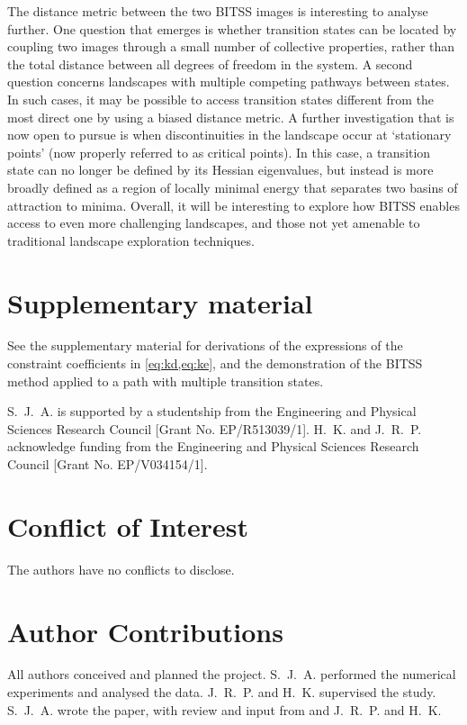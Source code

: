 \documentclass[aip,jcp,reprint,twocolumn]{revtex4-1}
\begin{document}
The distance metric between the two BITSS images is interesting to analyse further.
One question that emerges is whether transition states can be located by coupling two images through a small number of collective properties, rather than the total distance between all degrees of freedom in the system.
A second question concerns landscapes with multiple competing pathways between states.
In such cases, it may be possible to access transition states different from the most direct one by using a biased distance metric.
A further investigation that is now open to pursue is when discontinuities in the landscape occur at `stationary points' (now properly referred to as critical points).
In this case, a transition state can no longer be defined by its Hessian eigenvalues, but instead is more broadly defined as a region of locally minimal energy that separates two basins of attraction to minima.
Overall, it will be interesting to explore how BITSS enables access to even more challenging landscapes, and those not yet amenable to traditional landscape exploration techniques.


\section*{Supplementary material}
See the supplementary material for derivations of the expressions of the constraint coefficients in \cref{eq:kd,eq:ke}, and the demonstration of the BITSS method applied to a path with multiple transition states.

\begin{acknowledgments}
  S.~J.~A. is supported by a studentship from the Engineering and Physical Sciences Research Council [Grant No. EP/R513039/1].
  H.~K. and J.~R.~P. acknowledge funding from the Engineering and Physical Sciences Research Council [Grant No. EP/V034154/1].
\end{acknowledgments}

\section*{Conflict of Interest}
The authors have no conflicts to disclose.

\section*{Author Contributions}
All authors conceived and planned the project.
S.~J.~A. performed the numerical experiments and analysed the data.
J.~R.~P. and H.~K. supervised the study.
S.~J.~A. wrote the paper, with review and input from and J.~R.~P. and H.~K.
\end{document}
